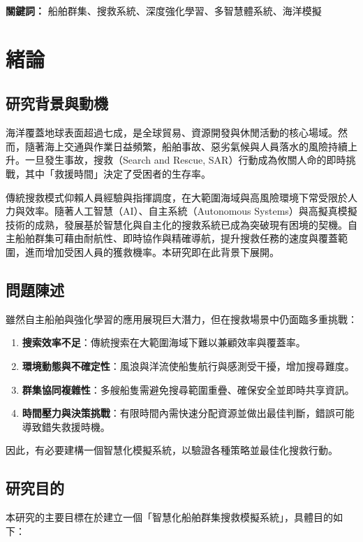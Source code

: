 \documentclass[12pt,a4paper]{article}
\begin{document}
\centerline{\textbf{關鍵詞：} 船舶群集、搜救系統、深度強化學習、多智慧體系統、海洋模擬}

\newpage

\tableofcontents
\newpage

\section{緒論}

\subsection{研究背景與動機}
海洋覆蓋地球表面超過七成，是全球貿易、資源開發與休閒活動的核心場域。然而，隨著海上交通與作業日益頻繁，船舶事故、惡劣氣候與人員落水的風險持續上升。一旦發生事故，搜救（Search and Rescue, SAR）行動成為攸關人命的即時挑戰，其中「救援時間」決定了受困者的生存率。

傳統搜救模式仰賴人員經驗與指揮調度，在大範圍海域與高風險環境下常受限於人力與效率。隨著人工智慧（AI）、自主系統（Autonomous Systems）與高擬真模擬技術的成熟，發展基於智慧化與自主化的搜救系統已成為突破現有困境的契機。自主船舶群集可藉由耐航性、即時協作與精確導航，提升搜救任務的速度與覆蓋範圍，進而增加受困人員的獲救機率。本研究即在此背景下展開。

\subsection{問題陳述}
雖然自主船舶與強化學習的應用展現巨大潛力，但在搜救場景中仍面臨多重挑戰：

\begin{enumerate}
\item \textbf{搜索效率不足}：傳統搜索在大範圍海域下難以兼顧效率與覆蓋率。
\item \textbf{環境動態與不確定性}：風浪與洋流使船隻航行與感測受干擾，增加搜尋難度。
\item \textbf{群集協同複雜性}：多艘船隻需避免搜尋範圍重疊、確保安全並即時共享資訊。
\item \textbf{時間壓力與決策挑戰}：有限時間內需快速分配資源並做出最佳判斷，錯誤可能導致錯失救援時機。
\end{enumerate}

因此，有必要建構一個智慧化模擬系統，以驗證各種策略並最佳化搜救行動。

\subsection{研究目的}
本研究的主要目標在於建立一個「智慧化船舶群集搜救模擬系統」，具體目的如下：
\end{document}
